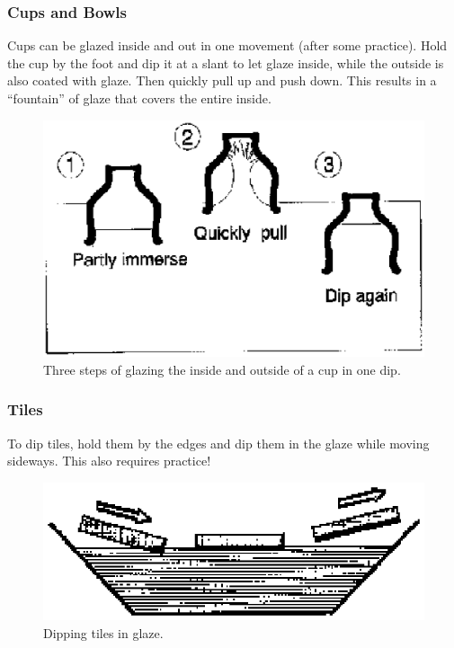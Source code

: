 \subsubsection{Cups and Bowls}
Cups can be glazed inside and out in one movement (after some practice). Hold 
the cup by the foot and dip it at a slant to let glaze inside, while the 
outside is also coated with glaze. Then quickly pull up and push down. This 
results in a ``fountain'' of glaze that covers the entire inside.
\begin{figure}[htbp!]
  \centering
  \includegraphics[width=0.7\linewidth]{img/glazingcup.eps}
  \caption{Three steps of glazing the inside and outside of a cup in one dip.}
  \label{fig:glazingcup}
\end{figure}
\subsubsection{Tiles}
To dip tiles, hold them by the edges and dip them in the glaze while moving 
sideways. This also requires practice!
\begin{figure}[htbp!]
  \centering
  \includegraphics[width=0.7\linewidth]{img/glazingtile.eps}
  \caption{Dipping tiles in glaze.}
  \label{fig:glazingtile}
\end{figure}
